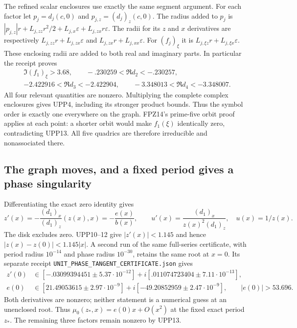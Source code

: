 \documentclass[11pt]{article}
\begin{document}
The refined scalar enclosures use exactly the same segment argument.
For each factor let $p_j=d_j(c,0)$ and $p_{j,z}=(d_j)_z(c,0)$.
The radius added to $p_j$ is
$|p_{j,z}|r+L_{j,zz}r^2/2+L_{j,x}\varepsilon
+L_{j,zx}r\varepsilon$.
The radii for its $z$ and $x$ derivatives are respectively
$L_{j,zz}r+L_{j,zx}\varepsilon$ and
$L_{j,zx}r+L_{j,xx}\varepsilon$.
For $(f_j)_\xi$ it is
$L_{j,\xi z}r+L_{j,\xi x}\varepsilon$.
These enclosing radii are added to both real and imaginary parts.
In particular the receipt proves
\[
 \begin{gathered}
 \Im(f_1)_\xi>3.68,\qquad
 -.230259<\Re d_2<-.230257,\\
 -2.422916<\Re d_3<-2.422904,\qquad
 -3.348013<\Re d_4<-3.348007.
 \end{gathered}\tag{UPP13}
\]
All four relevant quantities are nonzero. Multiplying the complete
complex enclosures gives UPP4, including its stronger product bounds.
Thus the symbol order is exactly one everywhere on the graph.
FPZ14's prime-five orbit proof applies at each point: a shorter
orbit would make $f_1(\xi)$ identically zero, contradicting UPP13.
All five quadrics are therefore irreducible and nonassociated there.

\subsection{The graph moves, and a fixed period gives a phase singularity}
Differentiating the exact zero identity gives
\[
 z'(x)=-\frac{(d_1)_x}{(d_1)_z}(z(x),x)
       =-\frac{e(x)}{b(x)},\qquad
 u'(x)=\frac{(d_1)_x}{z(x)^2(d_1)_z},\quad u(x)=1/z(x).
 \tag{UPP14}
\]
The disk excludes zero. UPP10--12 give $|z'(x)|<1.145$ and hence
$|z(x)-z(0)|<1.145|x|$. A second run of the same full-series
certificate, with period radius $10^{-14}$ and phase radius
$10^{-30}$, retains the same root at $x=0$. Its separate receipt
\texttt{UNIT\_PHASE\_TANGENT\_CERTIFICATE.json} gives
\[
 \begin{aligned}
 z'(0)&\in[-.03099394451\pm5.37\cdot10^{-12}]
       +i[.011074723404\pm7.11\cdot10^{-13}],\\
 e(0)&\in[21.49053615\pm2.97\cdot10^{-9}]
       +i[-49.20852959\pm2.47\cdot10^{-9}],\qquad |e(0)|>53.696.
 \end{aligned}\tag{UPP15}
\]
Both derivatives are nonzero; neither statement is a numerical
guess at an unenclosed root. Thus $\mu_0(z_*,x)=e(0)x+O(x^2)$
at the fixed exact period $z_*$. The remaining three factors remain
nonzero by UPP13.
\end{document}
